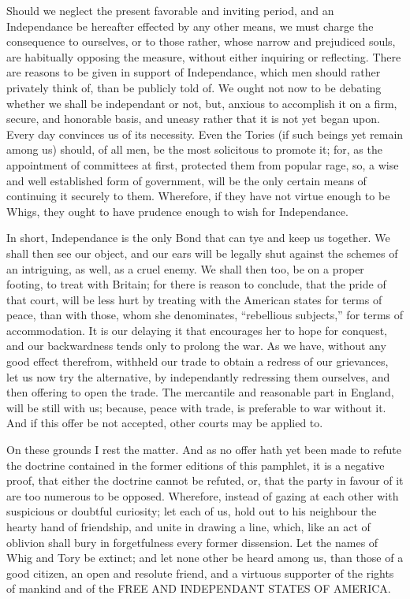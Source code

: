 \documentclass[12pt,oneside]{memoir}
\begin{document}
Should we neglect the present favorable and inviting period, and an
Independance be hereafter effected by any other means, we must
charge the consequence to ourselves, or to those rather, whose
narrow and prejudiced souls, are habitually opposing the measure,
without either inquiring or reflecting. There are reasons to be
given in support of Independance, which men should rather privately
think of, than be publicly told of. We ought not now to be debating
whether we shall be independant or not, but, anxious to accomplish
it on a firm, secure, and honorable basis, and uneasy rather that it
is not yet began upon. Every day convinces us of its necessity. Even
the Tories (if such beings yet remain among us) should, of all men,
be the most solicitous to promote it; for, as the appointment of
committees at first, protected them from popular rage, so, a wise
and well established form of government, will be the only certain
means of continuing it securely to them. Wherefore, if they have not
virtue enough to be Whigs, they ought to have prudence enough to
wish for Independance.

In short, Independance is the only Bond that can tye and keep us
together. We shall then see our object, and our ears will be legally
shut against the schemes of an intriguing, as well, as a cruel enemy.
We shall then too, be on a proper footing, to treat with Britain;
for there is reason to conclude, that the pride of that court, will
be less hurt by treating with the American states for terms of peace,
than with those, whom she denominates, ``rebellious subjects,'' for
terms of accommodation. It is our delaying it that encourages her to
hope for conquest, and our backwardness tends only to prolong the
war. As we have, without any good effect therefrom, withheld our
trade to obtain a redress of our grievances, let us now try the
alternative, by independantly redressing them ourselves, and then
offering to open the trade. The mercantile and reasonable part in
England, will be still with us; because, peace with trade, is
preferable to war without it. And if this offer be not accepted,
other courts may be applied to.

On these grounds I rest the matter. And as no offer hath yet been
made to refute the doctrine contained in the former editions of this
pamphlet, it is a negative proof, that either the doctrine cannot be
refuted, or, that the party in favour of it are too numerous to be
opposed. Wherefore, instead of gazing at each other with suspicious
or doubtful curiosity; let each of us, hold out to his neighbour the
hearty hand of friendship, and unite in drawing a line, which, like
an act of oblivion shall bury in forgetfulness every former
dissension. Let the names of Whig and Tory be extinct; and let none
other be heard among us, than those of a good citizen, an open and
resolute friend, and a virtuous supporter of the rights of mankind
and of the FREE AND INDEPENDANT STATES OF AMERICA.
\end{document}
